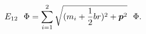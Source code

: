 \begin{equation}                                
E_{12}~~ \Phi=\sum_{i=1}^{2}\sqrt{(m_{i}+\frac{1}{2}br)^{2}+                              
\mbox{\boldmath $p$}^{2}}~~\Phi.                                
\end{equation} 
